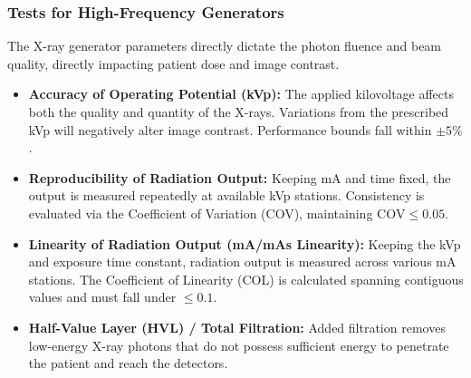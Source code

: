 \subsubsection{Tests for High-Frequency Generators}
The X-ray generator parameters directly dictate the photon fluence and beam quality, directly impacting patient dose and image contrast.
\begin{itemize}
    \item \textbf{Accuracy of Operating Potential (kVp):} The applied kilovoltage affects both the quality and quantity of the X-rays. Variations from the prescribed kVp will negatively alter image contrast. Performance bounds fall within $\pm 5\%$.
    \item \textbf{Reproducibility of Radiation Output:} Keeping mA and time fixed, the output is measured repeatedly at available kVp stations. Consistency is evaluated via the Coefficient of Variation (COV), maintaining $\text{COV} \leq 0.05$.
    \item \textbf{Linearity of Radiation Output (mA/mAs Linearity):} Keeping the kVp and exposure time constant, radiation output is measured across various mA stations. The Coefficient of Linearity (COL) is calculated spanning contiguous values and must fall under $\leq 0.1$.
    \item \textbf{Half-Value Layer (HVL) / Total Filtration:} Added filtration removes low-energy X-ray photons that do not possess sufficient energy to penetrate the patient and reach the detectors.
\end{itemize}

